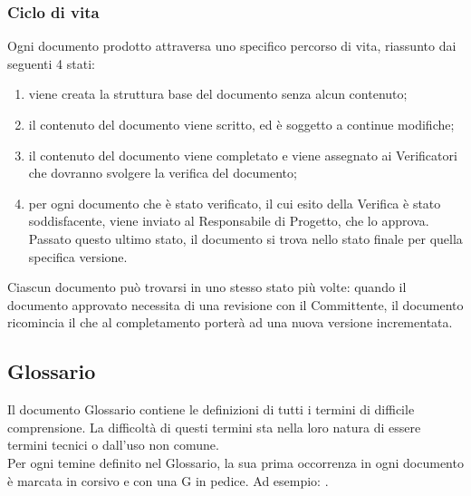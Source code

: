 \subsubsection{Ciclo di vita}
Ogni documento prodotto attraversa uno specifico percorso di vita, riassunto dai seguenti 4 stati:
\begin{enumerate}
\item {}viene creata la struttura base del documento senza alcun contenuto;
\item {}il contenuto del documento viene scritto, ed è soggetto a continue modifiche;
\item {}il contenuto del documento viene completato e viene assegnato ai Verificatori che dovranno svolgere la verifica del documento;
\item {}per ogni documento che è stato verificato, il cui esito della Verifica è stato soddisfacente, viene inviato al Responsabile di Progetto, che lo approva. Passato questo ultimo stato, il documento si trova nello stato finale per quella specifica versione.
\end{enumerate}

Ciascun documento può trovarsi in uno stesso stato più volte: quando il documento approvato necessita di una revisione con il Committente, il documento ricomincia il  che al completamento porterà ad una nuova versione incrementata.
\newpage

\subsection{Glossario}
\label{9.0}
Il documento Glossario contiene le definizioni di tutti i termini di difficile comprensione. La difficoltà di questi termini sta nella loro natura di essere termini tecnici o dall'uso non comune. \\
Per ogni temine definito nel Glossario, la sua prima occorrenza in ogni documento è marcata in corsivo e con una G in pedice. Ad esempio: .

